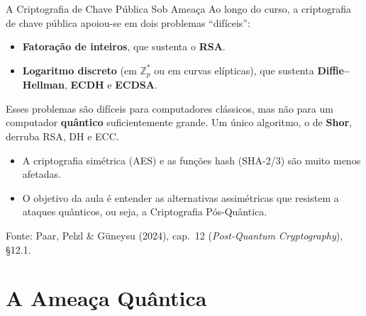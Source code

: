 \documentclass{beamer}
\begin{document}
\begin{frame}{A Criptografia de Chave Pública Sob Ameaça}
    Ao longo do curso, a criptografia de chave pública apoiou-se em dois problemas ``difíceis'':
    \begin{itemize}
        \footnotesize
        \item \textbf{Fatoração de inteiros}, que sustenta o \textbf{RSA}.
        \item \textbf{Logaritmo discreto} (em $\mathbb{Z}_p^*$ ou em curvas elípticas), que sustenta \textbf{Diffie--Hellman}, \textbf{ECDH} e \textbf{ECDSA}.
    \end{itemize}
    \medskip
    \begin{tcolorbox}[colback=red!5,colframe=red!60!black,boxrule=0.5pt]
        \footnotesize
        Esses problemas são difíceis para computadores clássicos, mas não para um computador \textbf{quântico} suficientemente grande. Um único algoritmo, o de \textbf{Shor}, derruba RSA, DH e ECC.
    \end{tcolorbox}
    \medskip
    \begin{itemize}
        \footnotesize
        \item A criptografia simétrica (AES) e as funções hash (SHA-2/3) são muito menos afetadas.
        \item O objetivo da aula é entender as alternativas assimétricas que resistem a ataques quânticos, ou seja, a Criptografia Pós-Quântica.
    \end{itemize}
    \smallskip
    {\tiny Fonte: Paar, Pelzl \& Güneysu (2024), cap.\ 12 (\textit{Post-Quantum Cryptography}), §12.1.}
\end{frame}

\section{A Ameaça Quântica}
\end{document}
